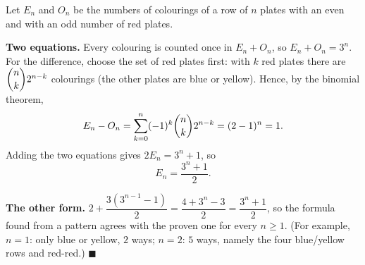 Let $E_n$ and $O_n$ be the numbers of colourings of a row of $n$ plates with an even and with an odd number of red plates.

\textbf{Two equations.} Every colouring is counted once in $E_n+O_n$, so $E_n+O_n=3^n$. For the difference, choose the set of red plates first: with $k$ red plates there are $\dbinom nk2^{n-k}$ colourings (the other plates are blue or yellow). Hence, by the binomial theorem,
\[
E_n-O_n=\sum_{k=0}^{n}(-1)^k\dbinom nk2^{n-k}=(2-1)^n=1 .
\]
Adding the two equations gives $2E_n=3^n+1$, so
\[
E_n=\boxed{\dfrac{3^n+1}{2}}.
\]

\textbf{The other form.} $2+\dfrac{3\left(3^{n-1}-1\right)}{2}=\dfrac{4+3^n-3}{2}=\dfrac{3^n+1}{2}$, so the formula found from a pattern agrees with the proven one for every $n\ge1$. (For example, $n=1$: only blue or yellow, $2$ ways; $n=2$: $5$ ways, namely the four blue/yellow rows and red-red.) $\blacksquare$
